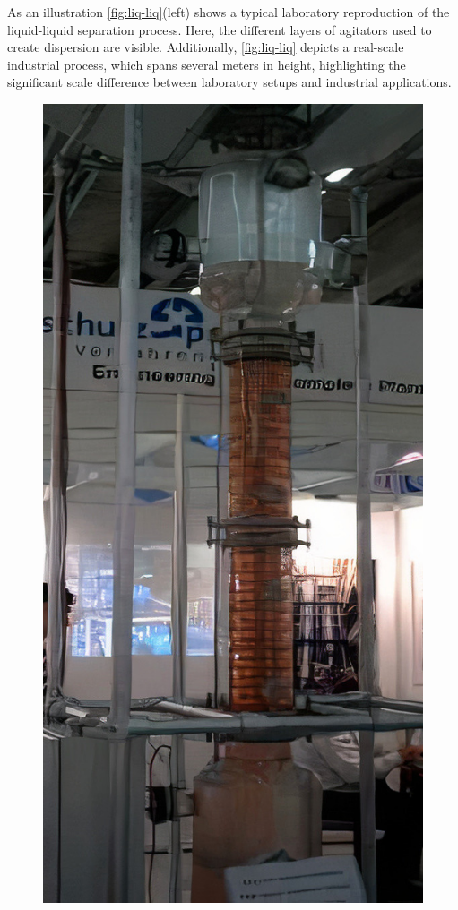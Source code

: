 As an illustration \ref{fig:liq-liq}(left) shows a typical laboratory reproduction of the liquid-liquid separation process. 
Here, the different layers of agitators used to create dispersion are visible. 
Additionally, \ref{fig:liq-liq} depicts a real-scale industrial process, which spans several meters in height, highlighting the significant scale difference between laboratory setups and industrial applications. 
\begin{figure}[h!]
    \centering
    \includegraphics[height=0.3\textheight]{image/liq-liq_LE_auto_x5.jpg}

\end{figure}
